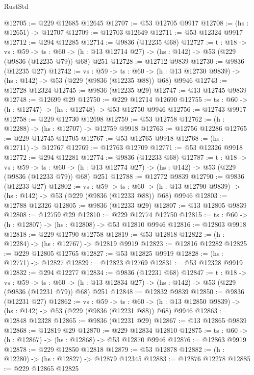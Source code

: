 \begin{lexlean}{RustStd}
\begin{coremodule}
@12705 := @229 @12685 @12645
@12707 := @53 @12705 @9917
@12708 := (hs : @12651) -> @12707
@12709 := @12703 @12649
@12711 := @53 @12324 @9917
@12712 := @294 @12285
@12714 := @9836 (@12235 @68)
@12727 := {t : @18} ->
  {vs : @59} ->
  {ts : @60} -> (h : @13 @12714 @27) -> (hs : @142) -> @53 (@229 (@9836 (@12235 @79)) @68) @251
@12728 := @12712 @9839
@12730 := @9836 (@12235 @27)
@12742 := {vs : @59} ->
  {ts : @60} -> (h : @13 @12730 @9839) -> (hs : @142) -> @53 (@229 (@9836 (@12235 @88)) @68) @9946
@12743 := @12728 @12324
@12745 := @9836 (@12235 @29)
@12747 := @13 @12745 @9839
@12748 := @12699 @29
@12750 := @229 @12714 @12690
@12755 := {ts : @60} -> (h : @12747) -> (hs : @12748) -> @53 @12750 @9946
@12756 := @12743 @9917
@12758 := @229 @12730 @12698
@12759 := @53 @12758
@12762 := (h : @12288) -> (hs : @12707) -> @12759 @9918
@12763 := @12756 @12286
@12765 := @229 @12745 @12705
@12767 := @53 @12765 @9918
@12768 := (hs : @12711) -> @12767
@12769 := @12763 @12709
@12771 := @53 @12326 @9918
@12772 := @294 @12281
@12774 := @9836 (@12233 @68)
@12787 := {t : @18} ->
  {vs : @59} ->
  {ts : @60} -> (h : @13 @12774 @27) -> (hs : @142) -> @53 (@229 (@9836 (@12233 @79)) @68) @251
@12788 := @12772 @9839
@12790 := @9836 (@12233 @27)
@12802 := {vs : @59} ->
  {ts : @60} -> (h : @13 @12790 @9839) -> (hs : @142) -> @53 (@229 (@9836 (@12233 @88)) @68) @9946
@12803 := @12788 @12326
@12805 := @9836 (@12233 @29)
@12807 := @13 @12805 @9839
@12808 := @12759 @29
@12810 := @229 @12774 @12750
@12815 := {ts : @60} -> (h : @12807) -> (hs : @12808) -> @53 @12810 @9946
@12816 := @12803 @9918
@12818 := @229 @12790 @12758
@12819 := @53 @12818
@12822 := (h : @12284) -> (hs : @12767) -> @12819 @9919
@12823 := @12816 @12282
@12825 := @229 @12805 @12765
@12827 := @53 @12825 @9919
@12828 := (hs : @12771) -> @12827
@12829 := @12823 @12769
@12831 := @53 @12328 @9919
@12832 := @294 @12277
@12834 := @9836 (@12231 @68)
@12847 := {t : @18} ->
  {vs : @59} ->
  {ts : @60} -> (h : @13 @12834 @27) -> (hs : @142) -> @53 (@229 (@9836 (@12231 @79)) @68) @251
@12848 := @12832 @9839
@12850 := @9836 (@12231 @27)
@12862 := {vs : @59} ->
  {ts : @60} -> (h : @13 @12850 @9839) -> (hs : @142) -> @53 (@229 (@9836 (@12231 @88)) @68) @9946
@12863 := @12848 @12328
@12865 := @9836 (@12231 @29)
@12867 := @13 @12865 @9839
@12868 := @12819 @29
@12870 := @229 @12834 @12810
@12875 := {ts : @60} -> (h : @12867) -> (hs : @12868) -> @53 @12870 @9946
@12876 := @12863 @9919
@12878 := @229 @12850 @12818
@12879 := @53 @12878
@12882 := (h : @12280) -> (hs : @12827) -> @12879 @12345
@12883 := @12876 @12278
@12885 := @229 @12865 @12825

\end{coremodule}
\end{lexlean}
